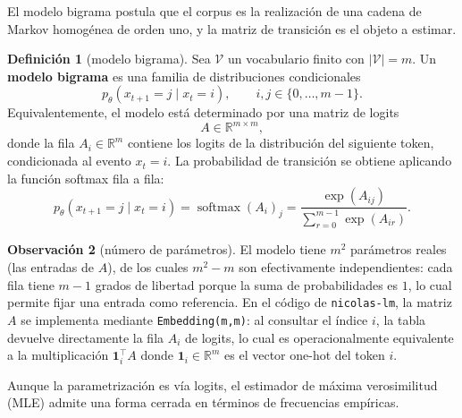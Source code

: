 \documentclass[11pt]{report}
\newenvironment{tcolorbox}[1][]{\par\medskip\noindent\ignorespaces}{\par\medskip}
\theoremstyle{definition}
\newtheorem{definicion}{Definición}[section]
\newtheorem{observacion}[definicion]{Observación}
\theoremstyle{plain}
\numberwithin{equation}{section}
\newcommand{\R}{\mathbb{R}}
\newcommand{\V}{\mathcal{V}}
\newcommand{\softmax}{\operatorname{softmax}}
\begin{document}
El modelo bigrama postula que el corpus es la realización de una cadena de Markov homogénea de orden uno, y la matriz de transición es el objeto a estimar.

\begin{tcolorbox}[colback=blue!8, colframe=blue!8, boxrule=0pt]
\begin{definicion}[modelo bigrama]
Sea \(\V\) un vocabulario finito con \(|\V|=m\). Un \textbf{modelo bigrama} es una familia de distribuciones condicionales
\begin{equation*}
    p_\theta(x_{t+1}=j\mid x_t=i),
    \qquad
    i,j\in\{0,\ldots,m-1\}.
\end{equation*}
Equivalentemente, el modelo está determinado por una matriz de logits
\begin{equation*}
    A\in\R^{m\times m},
\end{equation*}
donde la fila \(A_i\in\R^m\) contiene los logits de la distribución del siguiente token, condicionada al evento \(x_t=i\). La probabilidad de transición se obtiene aplicando la función softmax fila a fila:
\begin{equation*}
    p_\theta(x_{t+1}=j\mid x_t=i)
    =
    \softmax(A_i)_j
    =
    \frac{\exp(A_{ij})}{\sum_{r=0}^{m-1}\exp(A_{ir})}.
\end{equation*}
\end{definicion}
\end{tcolorbox}

\begin{observacion}[número de parámetros]
El modelo tiene \(m^2\) parámetros reales (las entradas de \(A\)), de los cuales \(m^2-m\) son efectivamente independientes: cada fila tiene \(m-1\) grados de libertad porque la suma de probabilidades es \(1\), lo cual permite fijar una entrada como referencia. En el código de \texttt{nicolas-lm}, la matriz \(A\) se implementa mediante \texttt{Embedding(m,m)}: al consultar el índice \(i\), la tabla devuelve directamente la fila \(A_i\) de logits, lo cual es operacionalmente equivalente a la multiplicación \(\mathbf{1}_i^\top A\) donde \(\mathbf{1}_i\in\R^m\) es el vector one-hot del token \(i\).
\end{observacion}

Aunque la parametrización es vía logits, el estimador de máxima verosimilitud (MLE) admite una forma cerrada en términos de frecuencias empíricas.
\end{document}
